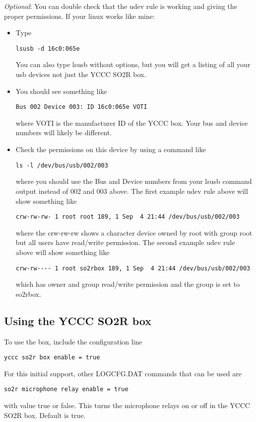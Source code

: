 \documentclass[12pt]{article}
\begin{document}
{\em Optional}: You can double check that the udev rule is working and
giving the proper permissions. If your linux works like mine:
\begin{itemize}
\item
Type
\begin{verbatim}
lsusb -d 16c0:065e
\end{verbatim}
You can also type lsusb without options,
but you will get a listing of all your usb
devices not just the YCCC SO2R box.
\item
You should see something like
\begin{verbatim}
Bus 002 Device 003: ID 16c0:065e VOTI
\end{verbatim}
where VOTI is the manufacturer ID of the YCCC box. Your bus and device
numbers will likely be different.
\item
Check the permissions on this device by using a command like
\begin{verbatim}
ls -l /dev/bus/usb/002/003
\end{verbatim}
where you should use the Bus and Device numbers from your lsusb command
output instead of 002 and 003 above.
The first example udev rule above will show something like
\begin{verbatim}
crw-rw-rw- 1 root root 189, 1 Sep  4 21:44 /dev/bus/usb/002/003
\end{verbatim}
where the crw-rw-rw shows a character device owned by root with group root
but all users have read/write permission.
The second example udev rule above will show something like
\begin{verbatim}
crw-rw---- 1 root so2rbox 189, 1 Sep  4 21:44 /dev/bus/usb/002/003
\end{verbatim}
which has owner and group read/write permission and the group is set
to so2rbox.
\end{itemize}

\subsection{Using the YCCC SO2R box}
To use the box, include the configuration line
\begin{verbatim}
yccc so2r box enable = true
\end{verbatim}

For this initial support, other LOGCFG.DAT commands that can be used are
\begin{verbatim}
so2r microphone relay enable = true
\end{verbatim}
with value true or false. This turns the microphone relays on or off
in the YCCC SO2R box. Default is true.
\end{document}

